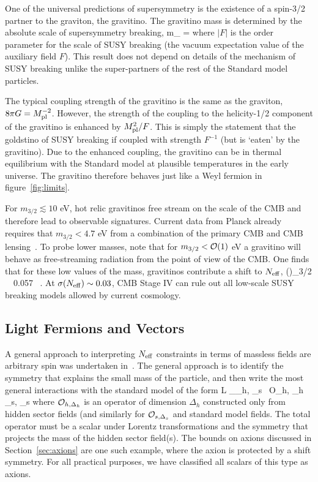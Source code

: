 One of the universal predictions of supersymmetry is the existence of a spin-3/2 partner to the graviton, the gravitino.  The gravitino mass is determined by the absolute scale of supersymmetry breaking, 
\beq
m_{} = 
\eeq
where $|F|$ is the order parameter for the scale of SUSY breaking (the vacuum expectation value of the auxiliary field $F$).  This result does not depend on details of the mechanism of SUSY breaking unlike the super-partners of the rest of the Standard model particles.

The typical coupling strength of the gravitino is the same as the graviton, $8 \pi G = M_{\rm pl}^{-2}$.  However, the strength of the coupling to the helicity-1/2 component of the gravitino is enhanced by $M_{\rm pl}^2 /F$.  This is simply the statement that the goldstino of SUSY breaking if coupled with strength $F^{-1}$ (but is `eaten' by the gravitino).  Due to the enhanced coupling, the gravitino can be in thermal equilibrium with the Standard model at plausible temperatures in the early universe.  The gravitino therefore behaves just like a Weyl fermion in figure~\ref{fig:limits}.

For $m_{3/2} \lesssim 10$ eV, hot relic gravitinos free stream on the scale of the CMB and therefore lead to observable signatures.  Current data from Planck already requires that $m_{3/2} < 4.7$ eV from a combination of the primary CMB and CMB lensing~\cite{Osato:2016ixc}.  To probe lower masses, note that for $m_{3/2} < {\cal O}(1)$ eV a gravitino will behave as free-streaming radiation from the point of view of the CMB.  One finds that for these low values of the mass, gravitinos contribute a shift to $N_{\rm eff}$,
\beq
\left(\Delta \Neff\right)_{3/2} \, \gtrsim \, 0.057 \ .
\eeq
At $\sigma(N_{\rm eff}) \sim 0.03$, CMB Stage IV can rule out all low-scale SUSY breaking models allowed by current cosmology.  

\subsection{Light Fermions and Vectors}

A general approach to interpreting $N_{\rm eff}$ constraints in terms of massless fields are arbitrary spin was undertaken in~\cite{Brust:2013xpv}.  The general approach is to identify the symmetry that explains the small mass of the particle, and then write the most general interactions with the standard model of the form
\beq
{\cal L} \supset \sum_{\Delta_h, \Delta_s}  \,  {\cal O}_{h, \Delta_h} _{s, \Delta_s}
\eeq
where ${\cal O}_{h,\Delta_h}$ is an operator of dimension $\Delta_h$ constructed only from hidden sector fields (and similarly for ${\cal O}_{s, \Delta_s}$ and standard model fields.  The total operator must be a scalar under Lorentz transformations and the symmetry that projects the mass of the hidden sector field(s).  The bounds on axions discussed in Section~\ref{sec:axions} are one such example, where the axion is protected by a shift symmetry.  For all practical purposes, we have classified all scalars of this type as axions.



